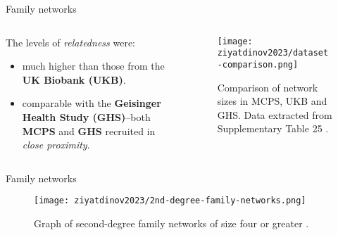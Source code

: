 \begin{frame}{Family networks}
    \begin{columns}
        \begin{column}{0.5\textwidth}

            The levels of \textit{relatedness} were:
            \begin{itemize}
                \item much higher than those from the \textbf{UK Biobank (UKB)}.
                \item comparable with the \textbf{Geisinger Health Study (GHS)}--both \textbf{MCPS} and \textbf{GHS} recruited in \textit{close proximity}.
            \end{itemize}
        \end{column}

        \begin{column}{0.5\textwidth}
            \begin{figure}[htpb]
                \centering
                \texttt{[image: ziyatdinov2023/dataset-comparison.png]}
                \caption{Comparison of network sizes in MCPS, UKB and GHS. Data extracted from Supplementary Table 25 \parencite{ziyatdinov2023}.}
                \label{fig:label}
            \end{figure}
        \end{column}
    \end{columns}
\end{frame}

\begin{frame}[t]{Family networks}

    \begin{figure}[htpb]
        \centering
        \texttt{[image: ziyatdinov2023/2nd-degree-family-networks.png]}
        \caption{Graph of second-degree family networks of size four or greater \parencite{ziyatdinov2023}.}
        \label{fig:2nd-degree-megaplot}
    \end{figure}

\end{frame}